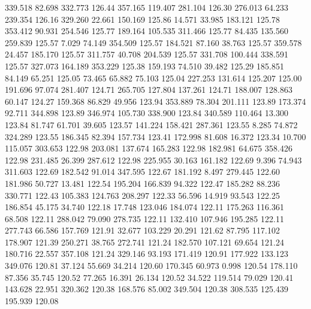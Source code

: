  339.518   82.698  332.773       126.44
 357.165  119.407  281.104       126.30
 276.013   64.233  239.354       126.16
 329.260   22.661  150.169       125.86
  14.571   33.985  183.121       125.78
 353.412   90.931  254.546       125.77
 189.164  105.535  311.466       125.77
  84.435  135.560  259.839       125.57
   7.029   74.149  354.509       125.57
 184.521   87.160   38.763       125.57
 359.578   24.457  185.170       125.57
 311.757   40.708  204.539       125.57
 331.708  100.444  338.591       125.57
 327.073  164.189  353.229       125.38
 159.193   74.510   39.482       125.29
 185.851   84.149   65.251       125.05
  73.465   65.882   75.103       125.04
 227.253  131.614  125.207       125.00
 191.696   97.074  281.407       124.71
 265.705  127.804  137.261       124.71
 188.007  128.863   60.147       124.27
 159.368   86.829   49.956       123.94
 353.889   78.304  201.111       123.89
 173.374   92.711  344.898       123.89
 346.974  105.730  338.900       123.84
 340.589  110.464   13.300       123.84
  81.747   61.701   39.605       123.57
 141.224  158.421  287.361       123.55
   8.285   74.872  324.289       123.55
 186.345   82.394  157.734       123.41
 172.998   81.608   16.372       123.34
  10.700  115.057  303.653       122.98
 203.081  137.674  165.283       122.98
 182.981   64.675  358.426       122.98
 231.485   26.399  287.612       122.98
 225.955   30.163  161.182       122.69
   9.396   74.943  311.603       122.69
 182.542   91.014  347.595       122.67
 181.192    8.497  279.445       122.60
 181.986   50.727   13.481       122.54
 195.204  166.839   94.322       122.47
 185.282   88.236  330.771       122.43
 105.383  124.763  208.297       122.33
  56.596   14.919   93.543       122.25
 186.854   45.175   34.740       122.18
  17.748  123.046  184.074       122.11
 175.263  116.361   68.508       122.11
 288.042   79.090  278.735       122.11
 132.410  107.946  195.285       122.11
 277.743   66.586  157.769       121.91
  32.677  103.229   20.291       121.62
  87.795  117.102  178.907       121.39
 250.271   38.765  272.741       121.24
 182.570  107.121   69.654       121.24
 180.716   22.557  357.108       121.24
 329.146   93.193  171.419       120.91
 177.922  133.123  349.076       120.81
  37.124   55.669   34.214       120.60
 170.345   60.973    0.998       120.54
 178.110   87.356   35.745       120.52
  77.265   16.391   26.134       120.52
  34.522  119.514   79.029       120.41
 143.628   22.951  320.362       120.38
 168.576   85.002  349.504       120.38
 308.535  125.439  195.939       120.08
